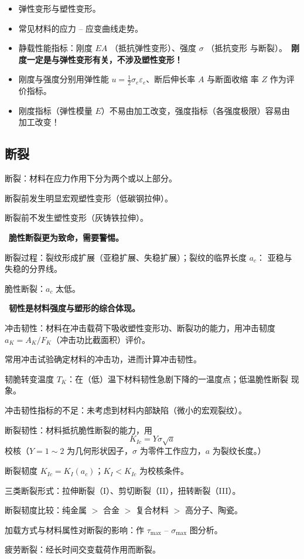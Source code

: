 \documentclass[12pt,a4paper]{article}
\newcommand{\tightlist}{\setlength{\parskip}{0pt}\setlength{\itemsep}{0pt}}
\newcommand{\hint}[1]{\textsf{（#1）}}
\newcommand{\minor}[1]{{\color{gray} #1}}
\renewcommand{\emph}[1]{\faIcon{lightbulb}\ \textbf{#1}}
\newcommand{\emphitem}[1]{\item[\faLightbulb]\ \textbf{#1}}
\newcommand{\ve}{\varepsilon}
\begin{document}
\begin{itemize}\tightlist
  \item 弹性变形与塑性变形。
  \item 常见材料的应力 -- 应变曲线走势。
  \item 静载性能指标：刚度 $EA$ \hint{抵抗弹性变形}、强度 $\sigma$ \hint{抵抗变形
  与断裂}。\emph{刚度一定是与弹性变形有关，不涉及塑性变形！}
  \item 刚度与强度分别用弹性能 $u=\frac12\sigma_e\ve_e$、断后伸长率 $A$ 与断面收缩
  率 $Z$ 作为评价指标。
  \item 刚度指标\hint{弹性模量 $E$}不易由加工改变，强度指标\hint{各强度极限}容易由
  加工改变！
\end{itemize}

\subsection{断裂}

\begin{itemize}\tightlist
  \item 断裂：材料在应力作用下分为两个或以上部分。
  \begin{description}\tightlist
      \item[韧性断裂] 断裂前发生明显宏观塑性变形\hint{低碳钢拉伸}。
      \item[脆性断裂] 断裂前不发生塑性变形\hint{灰铸铁拉伸}。
  \end{description}
  \emphitem{脆性断裂更为致命，需要警惕。}
  \item 断裂过程：裂纹形成\to 扩展\hint{亚稳扩展、失稳扩展}；裂纹的临界长度 $a_c$：
  亚稳与失稳的分界线。
  \item 脆性断裂：$a_c$ 太低。
  \emphitem{韧性是材料强度与塑形的综合体现。}
  \item 冲击韧性：材料在冲击载荷下吸收塑性变形功、断裂功的能力，用冲击韧度 $a_K=A_K/
  F_K$\hint{冲击功比截面积}评价。
  \minor{\item 常用冲击试验确定材料的冲击功，进而计算冲击韧性。}
  \item 韧脆转变温度 $T_K$：在\hint{低}温下材料韧性急剧下降的一温度点；低温脆性断裂
  现象。
  \item 冲击韧性指标的不足：未考虑到材料内部缺陷\hint{微小的宏观裂纹}。
  \item 断裂韧性：材料抵抗脆性断裂的能力，用
  \[K_{Ic}=Y\sigma\sqrt a\]
  校核\hint{$Y=1\sim2$ 为几何形状因子，$\sigma$ 为零件工作应力，$a$ 为裂纹长度。}
  \item 断裂韧度 $K_{Ic}=K_I(a_c)$；$K_I<K_{Ic}$ 为校核条件。
  \item \minor{三类断裂形式：拉伸断裂（I）、剪切断裂（II），扭转断裂（III）。}
  \item 断裂韧度比较：纯金属 $>$ 合金 $>$ 复合材料 $>$ 高分子、陶瓷。
  \item 加载方式与材料属性对断裂的影响：作 $\tau_{\max}$ -- $\sigma_{\max}$ 图分析。
  \item 疲劳断裂：经长时间交变载荷作用而断裂。
\end{itemize}
\end{document}
